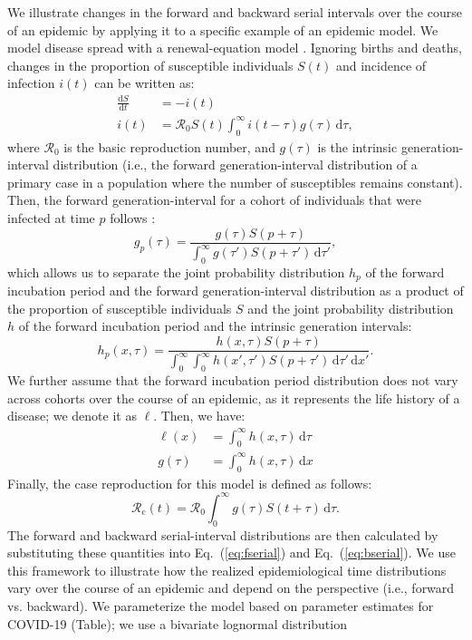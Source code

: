 \documentclass[12pt]{article}
\newcommand{\eref}[1]{Eq.~(\ref{eq:#1})}
\newcommand{\Rx}[1]{\ensuremath{{\mathcal R}_{#1}}\xspace}
\newcommand{\Ro}{\Rx{0}}
\newcommand{\Rc}{\Rx{\mathrm{c}}}
\newcommand{\dd}[1]{\ensuremath{\, \mathrm{d}#1}}
\newcommand{\dtau}{\dd{\tau}}
\newcommand{\dx}{\dd{x}}
\newcommand{\psymp}{\ensuremath{p}} %
\newcommand{\gdist}{g} %
\newcommand{\idist}{\ell} %
\begin{document}
We illustrate changes in the forward and backward serial intervals over the course of an epidemic by applying it to a specific example of an epidemic model. 
We model disease spread with a renewal-equation model \citep{heesterbeek1996concept, diekmann2000mathematical, roberts2004modelling, aldis2005integral, roberts2007model, champredon2018equivalence}.
Ignoring births and deaths, changes in the proportion of susceptible individuals $S(t)$ and incidence of infection $i(t)$ can be written as:
\begin{align}
\frac{\mathrm{d}S}{\mathrm{d}t} &= - i(t)\nonumber\\
i(t) &= \Ro S(t) \int_0^\infty i(t-\tau) \gdist(\tau) \dtau,
\label{eq:renewal}
\end{align}
where \Ro is the basic reproduction number, and $\gdist(\tau)$ is the intrinsic generation-interval distribution (i.e., the forward generation-interval distribution of a primary case in a population where the number of susceptibles remains constant).
Then, the forward generation-interval for a cohort of individuals that were infected at time $\psymp$ follows \citep{champredon2015intrinsic}:
\begin{equation}
\gdist_\psymp (\tau) = \frac{ \gdist(\tau) S(\psymp + \tau)}{\int_0^\infty \gdist(\tau') S(\psymp + \tau') \dtau'},
\end{equation}
which allows us to separate the joint probability distribution $h_\psymp$ of the forward incubation period and the forward generation-interval distribution as a product of the proportion of susceptible individuals $S$ and the joint probability distribution $h$ of the forward incubation period and the intrinsic generation intervals:
\begin{equation}
h_\psymp (x, \tau) = \frac{h(x, \tau) S(\psymp + \tau)}{\int_0^\infty \int_0^\infty h(x', \tau') S(\psymp + \tau') \dtau' \dx'}.
\end{equation}
We further assume that the forward incubation period distribution does
not vary across cohorts over the course of an epidemic, as it
represents the life history of a disease; we denote it as $\idist$.
Then, we have:
\begin{align}
\idist(x) &= \int_0^\infty h(x, \tau) \dtau\nonumber\\
\gdist(\tau) &= \int_0^\infty h(x, \tau) \dx
\label{eq:marginal}
\end{align}
Finally, the case reproduction for this model is defined as follows:
\begin{equation}
\Rc(t) = \Ro \int_0^\infty \gdist(\tau) S(t+\tau) \dtau.
\end{equation}
The forward and backward serial-interval distributions are then calculated by substituting these quantities into \eref{fserial} and \eref{bserial}.
We use this framework to illustrate how the realized epidemiological time distributions vary over the course of an epidemic and depend on the perspective (i.e., forward vs. backward).
We parameterize the model based on parameter estimates for COVID-19 (Table);
we use a bivariate lognormal distribution 
\end{document}
